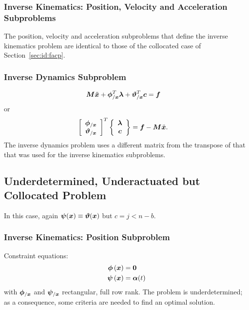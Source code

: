 \subsubsection{Inverse Kinematics: Position, Velocity and Acceleration Subproblems}
The position, velocity and acceleration subproblems
that define the inverse kinematics problem are identical
to those of the collocated case of Section~\ref{sec:id:facp}.

\subsubsection{Inverse Dynamics Subproblem}
\begin{align}
	\bm{M} \ddot{\bm{x}}
	+
	\bm{\phi}_{/\bm{x}}^T \bm{\lambda}
	+
	\bm{\vartheta}_{/\bm{x}}^T \bm{c}
	&=
	\bm{f}
	\label{eq:id:fancp:ids}
\end{align}
or
\begin{align}
	\left[ \begin{array}{c} 
		\bm{\phi}_{/\bm{x}}
		\\
		\bm{\vartheta}_{/\bm{x}}
	 \end{array} \right]^T \left\{ \begin{array}{c} 
		\bm{\lambda}
		\\
		\bm{c}
	 \end{array} \right\}
	&=
	\bm{f}
	-
	\bm{M} \ddot{\bm{x}}
	\label{eq:id:fancp}
	.
\end{align}
The inverse dynamics problem uses a different matrix from the transpose
of that that was used for the inverse kinematics subproblems.



\subsection{Underdetermined, Underactuated but Collocated Problem}
\label{sec:id:uucp}
In this case, again $\bm{\psi}(\bm{x}) \equiv \bm{\vartheta}(\bm{x})$
but $c = j < n - b$.

\subsubsection{Inverse Kinematics: Position Subproblem}
Constraint equations:
\begin{subequations}
\begin{align}
	\bm{\phi}\left( \bm{x} \right)
	&=
	\bm{0}
	\\
	\bm{\psi}\left( \bm{x} \right)
	&=
	\bm{\alpha}(t)
\end{align}
\end{subequations}
with $\bm{\phi}_{/\bm{x}}$ and $\bm{\psi}_{/\bm{x}}$ rectangular, full row rank.
The problem is underdetermined;
as a consequence, some criteria are needed to find an optimal solution.

